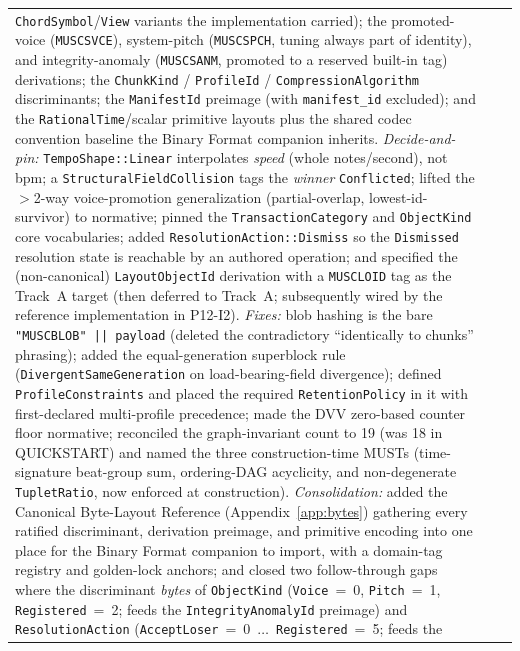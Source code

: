 \documentclass[11pt,letterpaper]{report}
\begin{document}
\begin{longtable}{p{2cm} p{2.5cm} p{9cm}}
  \texttt{ChordSymbol}/\texttt{View} variants the implementation
  carried); the promoted-voice (\texttt{MUSCSVCE}), system-pitch
  (\texttt{MUSCSPCH}, tuning always part of identity), and
  integrity-anomaly (\texttt{MUSCSANM}, promoted to a reserved
  built-in tag) derivations; the \texttt{ChunkKind} /
  \texttt{ProfileId} / \texttt{CompressionAlgorithm} discriminants;
  the \texttt{ManifestId} preimage (with \texttt{manifest\_id}
  excluded); and the \texttt{RationalTime}/scalar primitive layouts
  plus the shared codec convention baseline the Binary Format
  companion inherits. \emph{Decide-and-pin:} \texttt{TempoShape::Linear}
  interpolates \emph{speed} (whole notes/second), not bpm; a
  \texttt{StructuralFieldCollision} tags the \emph{winner}
  \texttt{Conflicted}; lifted the $>$2-way voice-promotion
  generalization (partial-overlap, lowest-id-survivor) to normative;
  pinned the \texttt{TransactionCategory} and \texttt{ObjectKind} core
  vocabularies; added \texttt{ResolutionAction::Dismiss} so the
  \texttt{Dismissed} resolution state is reachable by an authored
  operation; and specified the (non-canonical) \texttt{LayoutObjectId}
  derivation with a \texttt{MUSCLOID} tag as the Track~A target (then
  deferred to Track~A; subsequently wired by the reference
  implementation in P12-I2). \emph{Fixes:} blob hashing
  is the bare \texttt{"MUSCBLOB" || payload} (deleted the
  contradictory ``identically to chunks'' phrasing); added the
  equal-generation superblock rule (\texttt{DivergentSameGeneration}
  on load-bearing-field divergence); defined \texttt{ProfileConstraints}
  and placed the required \texttt{RetentionPolicy} in it with
  first-declared multi-profile precedence; made the DVV zero-based
  counter floor normative; reconciled the graph-invariant count to 19
  (was 18 in QUICKSTART) and named the three construction-time MUSTs
  (time-signature beat-group sum, ordering-DAG acyclicity, and
  non-degenerate \texttt{TupletRatio}, now enforced at construction).
  \emph{Consolidation:} added the Canonical Byte-Layout Reference
  (Appendix~\ref{app:bytes}) gathering every ratified discriminant,
  derivation preimage, and primitive encoding into one place for the
  Binary Format companion to import, with a domain-tag registry and
  golden-lock anchors; and closed two follow-through gaps where the
  discriminant \emph{bytes} of \texttt{ObjectKind} (\texttt{Voice}~=~0,
  \texttt{Pitch}~=~1, \texttt{Registered}~=~2; feeds the
  \texttt{IntegrityAnomalyId} preimage) and \texttt{ResolutionAction}
  (\texttt{AcceptLoser}~=~0~$\dots$~\texttt{Registered}~=~5; feeds the

\end{longtable}
\end{document}

